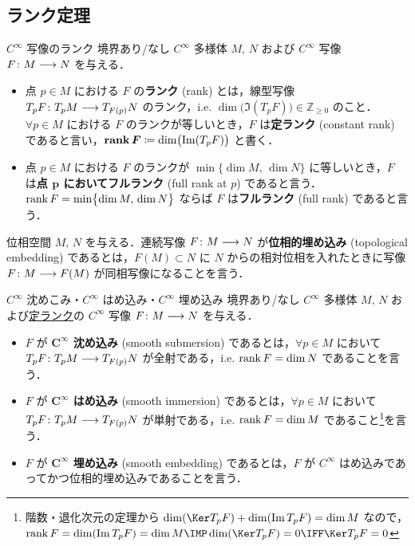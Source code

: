 \documentclass[geometry_main]{subfiles}
\begin{document}
\subsection{ランク定理}

\begin{mydef}[label=def:rank-smooth]{$C^\infty$ 写像のランク}
    境界あり/なし $C^\infty$ 多様体 $M,\, N$ および $C^\infty$ 写像 $F \colon M \longrightarrow N$ を与える．
    \begin{itemize}
        \item 点 $p \in M$ における $F$ の\textbf{ランク} (rank) とは，線型写像 $T_p F \colon T_p M \longrightarrow T_{F(p)} N$ のランク，i.e. $\dim \bigl(\Im (T_p F)\bigr) \in \mathbb{Z}_{\ge 0}$ のこと．$\forall p \in M$ における $F$ のランクが等しいとき，$F$ は\textbf{定ランク} (constant rank) であると言い，$\bm{\rank F} \coloneqq \dim \bigl(\Im (T_p F)\bigr)$ と書く．
        \item 点 $p \in M$ における $F$ のランクが $\min \bigl\{\dim M,\, \dim N\bigr\}$ に等しいとき，$F$ は\textbf{点 $\bm{p}$ においてフルランク} (full rank at $p$) であると言う．
        $\rank F = \min \bigl\{\dim M,\, \dim N\bigr\}$ ならば $F$ は\textbf{フルランク} (full rank) であると言う．
    \end{itemize}
\end{mydef}

位相空間 $M,\, N$ を与える．連続写像 $F \colon M \longrightarrow N$ が\textbf{位相的埋め込み} (topological embedding) であるとは，$F(M) \subset N$ に $N$ からの相対位相を入れたときに写像 $F \colon M \longrightarrow F(M)$ が同相写像になることを言う．

\begin{mydef}[label=def:submersion-smooth]{$C^\infty$ 沈めこみ・$C^\infty$ はめ込み・$C^\infty$ 埋め込み}
    境界あり/なし $C^\infty$ 多様体 $M,\, N$ および\hyperref[def:rank-smooth]{定ランク}の $C^\infty$ 写像 $F \colon M \longrightarrow N$ を与える．
    \begin{itemize}
        \item $F$ が\textbf{ $\bm{C^\infty}$ 沈め込み} (smooth submersion) であるとは，$\forall p \in M$ において $T_p F \colon T_p M \longrightarrow T_{F(p)} N$ が全射である，i.e. $\rank F = \dim N$ であることを言う．
        \item $F$ が\textbf{ $\bm{C^\infty}$ はめ込み} (smooth immersion) であるとは，$\forall p \in M$ において $T_p F \colon T_p M \longrightarrow T_{F(p)} N$ が単射である，i.e. $\rank F = \dim M$ であること\footnote{階数・退化次元の定理から $\dim (\Ker T_p F) + \dim (\Im T_p F) = \dim M$ なので，$\rank F = \dim (\Im T_p F) = \dim M \IMP \dim (\Ker T_p F) = 0 \IFF \Ker T_p F = 0$}を言う．
        \item $F$ が\textbf{ $\bm{C^\infty}$ 埋め込み} (smooth embedding) であるとは，$F$ が $C^\infty$ はめ込みであってかつ位相的埋め込みであることを言う．
    \end{itemize}
\end{mydef}
\end{document}
